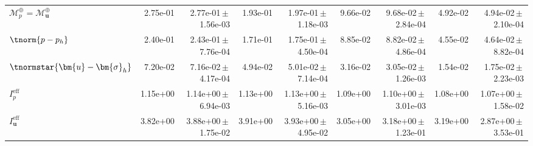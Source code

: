 \begin{table}
\begin{tabular}{lrrrrrrrr}
\midrule
$\mathcal{M}^{\oplus}_p=\mathcal{M}^{\oplus}_{\bm{u}}$ & 2.75e-01 & 2.77e-01\,$\pm$\,1.56e-03 & 1.93e-01 & 1.97e-01\,$\pm$\,1.18e-03 & 9.66e-02 & 9.68e-02\,$\pm$\,2.84e-04 & 4.92e-02 & 4.94e-02\,$\pm$\,2.10e-04 \\
$\tnorm{p-p_h}$ & 2.40e-01 & 2.43e-01\,$\pm$\,7.76e-04 & 1.71e-01 & 1.75e-01\,$\pm$\,4.50e-04 & 8.85e-02 & 8.82e-02\,$\pm$\,4.86e-04 & 4.55e-02 & 4.64e-02\,$\pm$\,8.82e-04 \\
$\tnormstar{\bm{u}-\bm{\sigma}_h}$ & 7.20e-02 & 7.16e-02\,$\pm$\,4.17e-04 & 4.94e-02 & 5.01e-02\,$\pm$\,7.14e-04 & 3.16e-02 & 3.05e-02\,$\pm$\,1.26e-03 & 1.54e-02 & 1.75e-02\,$\pm$\,2.23e-03 \\
$I^{\mathrm{eff}}_p$ & 1.15e+00 & 1.14e+00\,$\pm$\,6.94e-03 & 1.13e+00 & 1.13e+00\,$\pm$\,5.16e-03 & 1.09e+00 & 1.10e+00\,$\pm$\,3.01e-03 & 1.08e+00 & 1.07e+00\,$\pm$\,1.58e-02 \\
$I^{\mathrm{eff}}_{\bm{u}}$ & 3.82e+00 & 3.88e+00\,$\pm$\,1.75e-02 & 3.91e+00 & 3.93e+00\,$\pm$\,4.95e-02 & 3.05e+00 & 3.18e+00\,$\pm$\,1.23e-01 & 3.19e+00 & 2.87e+00\,$\pm$\,3.53e-01 \\
\bottomrule
\end{tabular}
\end{table}